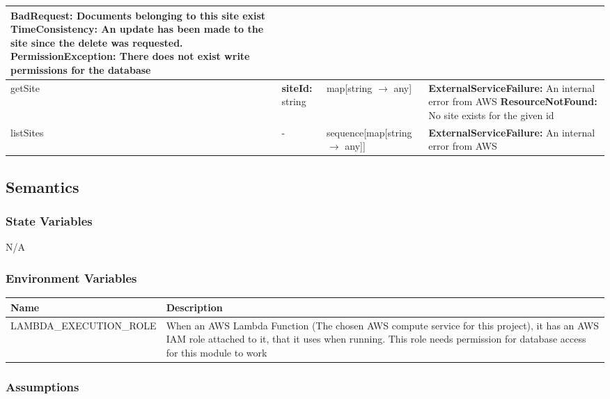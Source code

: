 \documentclass[12pt, titlepage]{article}
\begin{document}
\begin{center}
{\begin{tabular}{|p{4.5cm}|p{4cm}|p{4cm}|p{5cm}|}
      \textbf{BadRequest:} Documents belonging to this site exist \newline
      \textbf{TimeConsistency:} An update has been made to the site
      since the delete was requested. \newline
      \textbf{PermissionException:} There does not exist write
      permissions for the database \\
      \hline
      getSite & \textbf{siteId:} string & map[string $\rightarrow$
      any] & \textbf{ExternalServiceFailure:} An internal error from
      AWS \newline \textbf{ResourceNotFound:} No site exists for the given id \\
      \hline
      listSites & - & sequence[map[string $\rightarrow$ any]] &
      \textbf{ExternalServiceFailure:} An internal error from AWS \\
      \hline
    \end{tabular}
  }
\end{center}
\subsection{Semantics}

\subsubsection{State Variables}

N/A
\subsubsection{Environment Variables}
\begin{center}
  \begin{tabular}{p{6cm} p{10cm}}
    \hline
    \textbf{Name} & \textbf{Description} \\
    \hline
    LAMBDA\_EXECUTION\_ROLE & When an AWS Lambda Function (The chosen
    AWS compute service for this project), it has an AWS IAM role
    attached to it, that it uses when running. This role needs
    permission for database access for this module to work \\
    \hline
  \end{tabular}
\end{center}

\subsubsection{Assumptions}
\end{document}
